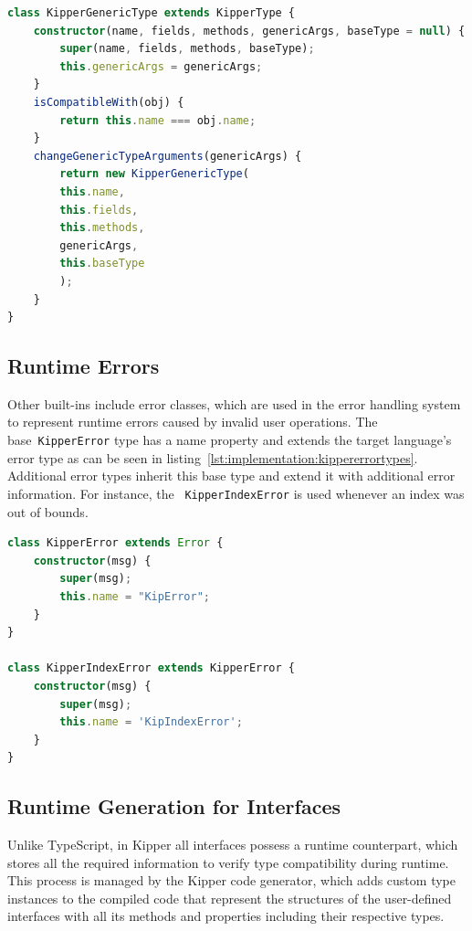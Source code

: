 \begin{lstlisting}[language=Typescript,caption=Generic Kipper Type,label=lst:implementation:generickippertype]
class KipperGenericType extends KipperType {
	constructor(name, fields, methods, genericArgs, baseType = null) {
		super(name, fields, methods, baseType);
		this.genericArgs = genericArgs;
	}
	isCompatibleWith(obj) {
		return this.name === obj.name;
	}
	changeGenericTypeArguments(genericArgs) {
		return new KipperGenericType(
		this.name,
		this.fields,
		this.methods,
		genericArgs,
		this.baseType
		);
	}
}
\end{lstlisting}

\subsection{Runtime Errors}

Other built-ins include error classes, which are used in the error handling system to represent runtime errors caused by invalid user operations. The base~\lstinline|KipperError| type has a name property and extends the target language's error type as can be seen in listing~\ref{lst:implementation:kippererrortypes}. Additional error types inherit this base type and extend it with additional error information. For instance, the ~\lstinline|KipperIndexError| is used whenever an index was out of bounds.

\begin{lstlisting}[language=Typescript,caption=Kipper error types,label=lst:implementation:kippererrortypes]
class KipperError extends Error {
	constructor(msg) {
		super(msg);
		this.name = "KipError";
	}
}

class KipperIndexError extends KipperError {
	constructor(msg) { 
		super(msg); 
		this.name = 'KipIndexError'; 
	} 
}
\end{lstlisting}

\subsection{Runtime Generation for Interfaces}

Unlike TypeScript, in Kipper all interfaces possess a runtime counterpart, which stores all the required information to verify type compatibility during runtime. This process is managed by the Kipper code generator, which adds custom type instances to the compiled code that represent the structures of the user-defined interfaces with all its methods and properties including their respective types.

